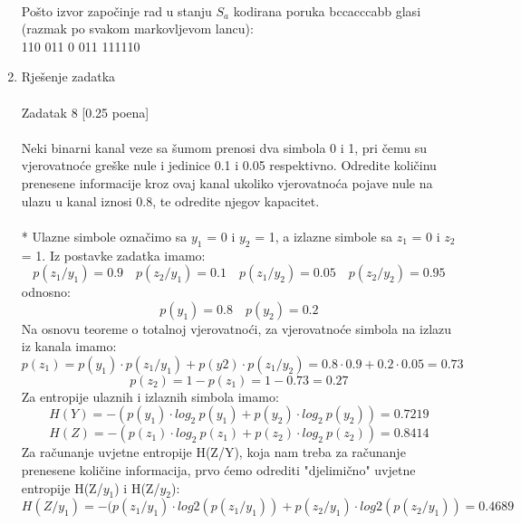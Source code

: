 \documentclass[12pt]{article}
\begin{document}
\begin{enumerate}
\\
Pošto izvor započinje rad u stanju $S_a$ kodirana poruka bccacccabb glasi (razmak po svakom markovljevom lancu):\\ 
110 011 0 011 111110 \\
		\item Rješenje zadatka \\
		\\
		Zadatak 8 [0.25 poena] \\
        \\
Neki binarni kanal veze sa šumom prenosi dva simbola 0 i 1, pri čemu su vjerovatnoće greške nule i jedinice 0.1 i 0.05 respektivno. Odredite količinu prenesene informacije kroz ovaj kanal ukoliko vjerovatnoća pojave nule na ulazu u kanal iznosi 0.8, te odredite njegov kapacitet. \\
\\
* Ulazne simbole označimo sa $y_1$ = 0 i $y_2$ = 1, a izlazne simbole sa $z_1$ = 0 i
$z_2$ = 1. Iz postavke zadatka imamo:
\begin{equation*}
    p(z_1/y_1) = 0.9 \quad p(z_2/y_1) = 0.1 \quad p(z_1/y_2) = 0.05 \quad p(z_2/y_2) = 0.95
\end{equation*}
odnosno:
\begin{equation*}
    p(y_1) = 0.8 \quad p(y_2) = 0.2
\end{equation*}
Na osnovu teoreme o totalnoj vjerovatnoći, za vjerovatnoće simbola na
izlazu iz kanala imamo:
\begin{equation*}
    p(z_1) = p(y_1) \cdot p(z_1/y_1) + p(y2)\cdot p(z_1/y_2) =  0.8\cdot0.9 + 0.2\cdot0.05 = 0.73
\end{equation*}
\begin{equation*}
    p(z_2) = 1 - p(z_1) = 1 - 0.73 = 0.27
\end{equation*}
Za entropije ulaznih i izlaznih simbola imamo:
\begin{equation*}
    H(Y) = -(p(y_1) \cdot log_2~p(y_1) + p(y_2) \cdot log_2~p(y_2)) = 0.7219
\end{equation*}
\begin{equation*}
    H(Z) = -(p(z_1) \cdot log_2~p(z_1) + p(z_2) \cdot log_2~p(z_2)) = 0.8414
\end{equation*}
\newpage
Za računanje uvjetne entropije H(Z/Y), koja nam treba za računanje
prenesene količine informacija, prvo ćemo odrediti "djelimično" uvjetne entropije H(Z/$y_1$) i H(Z/$y_2$):
\begin{equation*}
    H(Z/y_1) = -(p(z_1/y_1) \cdot log2(p(z_1/y_1)) + p(z_2/y_1) \cdot log2(p(z_2/y_1)) = 0.4689

\end{equation*}
\end{enumerate}
\end{document}
